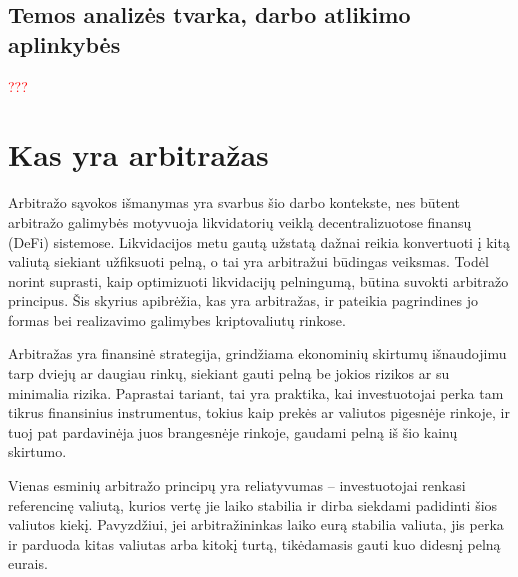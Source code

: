 \documentclass[]{VUMIFTemplateClass}
\begin{document}
\subsection*{Temos analizės tvarka, darbo atlikimo aplinkybės}
\textcolor{red}{
???
}

\section{Kas yra arbitražas}

Arbitražo sąvokos išmanymas yra svarbus šio darbo kontekste, nes būtent arbitražo galimybės motyvuoja likvidatorių veiklą decentralizuotose finansų (DeFi) sistemose. Likvidacijos metu gautą užstatą dažnai reikia konvertuoti į kitą valiutą siekiant užfiksuoti pelną, o tai yra arbitražui būdingas veiksmas. Todėl norint suprasti, kaip optimizuoti likvidacijų pelningumą, būtina suvokti arbitražo principus. Šis skyrius apibrėžia, kas yra arbitražas, ir pateikia pagrindines jo formas bei realizavimo galimybes kriptovaliutų rinkose.

Arbitražas yra finansinė strategija, grindžiama ekonominių skirtumų išnaudojimu tarp dviejų ar daugiau rinkų, siekiant gauti pelną be jokios rizikos ar su minimalia rizika. Paprastai tariant, tai yra praktika, kai investuotojai perka tam tikrus finansinius instrumentus, tokius kaip prekės ar valiutos pigesnėje rinkoje, ir tuoj pat pardavinėja juos brangesnėje rinkoje, gaudami pelną iš šio kainų skirtumo.

Vienas esminių arbitražo principų yra reliatyvumas -- investuotojai renkasi referencinę valiutą, kurios vertę jie laiko stabilia ir dirba siekdami padidinti šios valiutos kiekį. Pavyzdžiui, jei arbitražininkas laiko eurą stabilia valiuta, jis perka ir parduoda kitas valiutas arba kitokį turtą, tikėdamasis gauti kuo didesnį pelną eurais.
\end{document}
